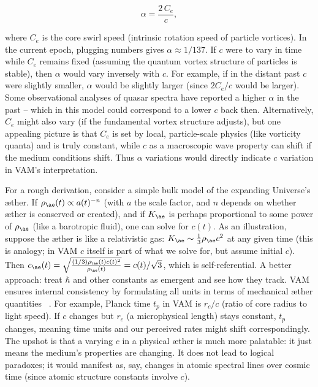 \documentclass[a4paper, aps,preprint,superscriptaddress, 12pt]{revtex4}
\begin{document}
\begin{equation}
    \alpha = \frac{2\,C_e}{c},
\end{equation}

where $C_e$ is the core swirl speed (intrinsic rotation speed of particle vortices). In the current epoch, plugging numbers gives $\alpha\approx1/137$. If $c$ were to vary in time while $C_e$ remains fixed (assuming the quantum vortex structure of particles is stable), then $\alpha$ would vary inversely with $c$. For example, if in the distant past $c$ were slightly smaller, $\alpha$ would be slightly larger (since $2C_e/c$ would be larger). Some observational analyses of quasar spectra have reported a higher $\alpha$ in the past – which in this model could correspond to a lower $c$ back then. Alternatively, $C_e$ might also vary (if the fundamental vortex structure adjusts), but one appealing picture is that $C_e$ is set by local, particle-scale physics (like vorticity quanta) and is truly constant, while $c$ as a macroscopic wave property can shift if the medium conditions shift. Thus $\alpha$ variations would directly indicate $c$ variation in VAM's interpretation.


For a rough derivation, consider a simple bulk model of the expanding Universe's æther. If $\rho_{\ae}(t) \propto a(t)^{-n}$ (with $a$ the scale factor, and $n$ depends on whether æther is conserved or created), and if $K_{\ae}$ is perhaps proportional to some power of $\rho_{\ae}$ (like a barotropic fluid), one can solve for $c(t)$. As an illustration, suppose the æther is like a relativistic gas: $K_{\ae}\sim \frac{1}{3}\rho_{\ae}c^2$ at any given time (this is analogy; in VAM $c$ itself is part of what we solve for, but assume initial $c$). Then $c_{\ae}(t) = \sqrt{\frac{(1/3)\rho_{\ae}(t)c(t)^2}{\rho_{\ae}(t)}} = c(t)/\sqrt{3}$, which is self-referential. A better approach: treat $\hbar$ and other constants as emergent and see how they track. VAM ensures internal consistency by formulating all units in terms of mechanical æther quantities~\cite{Iskandarani2025c} . For example, Planck time $t_p$ in VAM is $r_c/c$ (ratio of core radius to light speed). If $c$ changes but $r_c$ (a microphysical length) stays constant, $t_p$ changes, meaning time units and our perceived rates might shift correspondingly. The upshot is that a varying $c$ in a physical æther is much more palatable: it just means the medium's properties are changing. It does not lead to logical paradoxes; it would manifest as, say, changes in atomic spectral lines over cosmic time (since atomic structure constants involve $c$).
\end{document}
